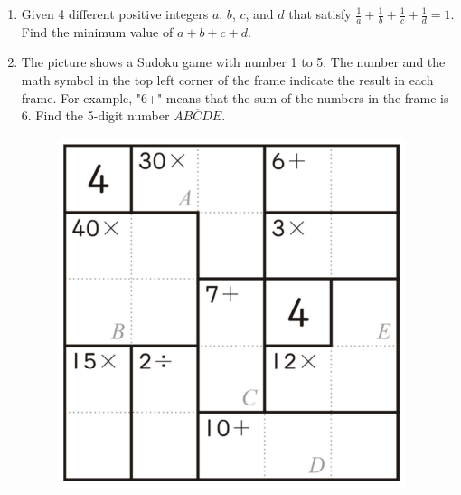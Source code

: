 \documentclass[12pt]{scrartcl}
\begin{document}
\begin{enumerate}[resume]
\hrulefill \item Given 4 different positive integers $a$, $b$, $c$, and $d$ that satisfy $\frac{1}{a} + \frac{1}{b} + \frac{1}{c} + \frac{1}{d} = 1$. Find the minimum value of $a+b+c+d$.

\hrulefill \item The picture shows a Sudoku game with number 1 to 5. The number and the math symbol in the top left corner of the frame indicate the result in each frame. For example, "6+" means that the sum of the numbers in the frame is 6. Find the 5-digit number $\overline{ABCDE}$.
    \begin{figure}[h]
        \centering
        \includegraphics[scale=0.5]{StarGen/0Figure/wmi-2020-5b-10.png}
    \end{figure}
    
\hrulefill
\end{enumerate}
\end{document}
